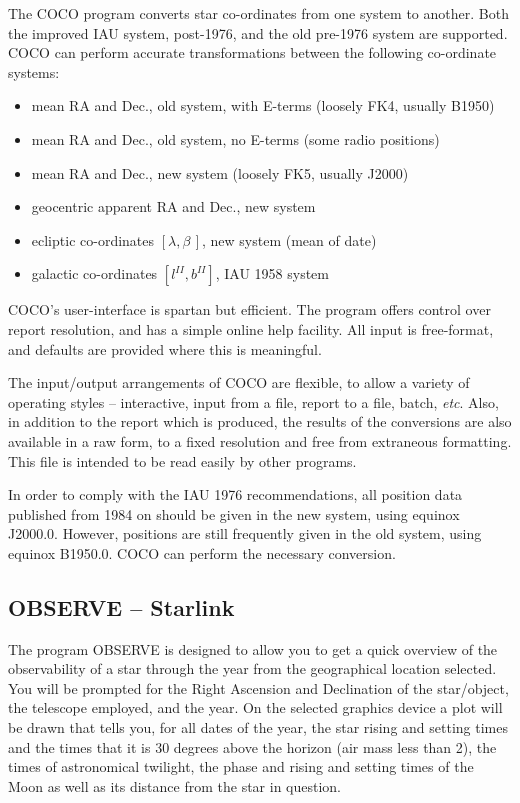 \documentclass[twoside,11pt]{article}
\newcommand{\htmladdnormallink}[2]{#1}
\newcommand{\xref}[3]{#1}
\newcommand{\xlabel}[1]{}
\newcommand{\COCOref}{\xref{COCO}{sun56}{}}
\newcommand{\OBSERVEref}{\xref{OBSERVE}{sun146}{}}
\newcommand{\STARLINKref}{\htmladdnormallink{Starlink}{http://star-www.rl.ac.uk/}}
\begin{document}
The {\COCOref} program converts star co-ordinates from one system to another.  Both
the improved IAU system, post-1976, and the old pre-1976 system are
supported. COCO can perform accurate transformations between the following
co-ordinate systems: 

\begin{itemize}
\item mean RA and Dec., old system, with E-terms (loosely FK4, usually B1950)
\item mean RA and Dec., old system, no E-terms (some radio positions)
\item mean RA and Dec., new system (loosely FK5, usually J2000)
\item geocentric apparent RA and Dec., new system
\item ecliptic co-ordinates $[\lambda,\beta\,]$, new system (mean of date)
\item galactic co-ordinates $[l^{II},b^{II}]$, IAU 1958 system
\end{itemize}

{\COCOref}'s user-interface is spartan but efficient.  The program offers control
over report resolution, and has a simple online help facility. All
input is free-format, and defaults are provided where this is meaningful. 
 
The input/output arrangements of COCO are flexible, to allow a variety of
operating styles -- interactive, input from a file, report to a file, batch,
{\it etc}. Also, in addition to the report which is produced, the results of
the conversions are also available in a raw form, to a fixed resolution and
free from extraneous formatting.
This file is intended to be read easily by other programs. 
 
In order to comply with the IAU 1976 recommendations, all position data
published from 1984 on should be given in the new system, using equinox
J2000.0. However, positions are still frequently given in the old system,
using equinox B1950.0. COCO can perform the necessary conversion.


\subsection{{\OBSERVEref} -- {\STARLINKref}} \xlabel{OBSERVE}
\label{sec:observe}
 
The program {\OBSERVEref} is designed to allow you to get a quick overview
of the observability of a star through the year from the geographical
location selected. You will be prompted for the Right Ascension and Declination 
of the star/object, the telescope employed, and the year. On the selected 
graphics device a
plot will be drawn that tells you, for all dates of the year, the star rising
and setting times and the times that it is 30 degrees above the horizon 
(air mass less than 2), the
times of astronomical twilight, the phase and rising and setting times of the
Moon as well as its distance from the star in question. 
 
\end{document}
